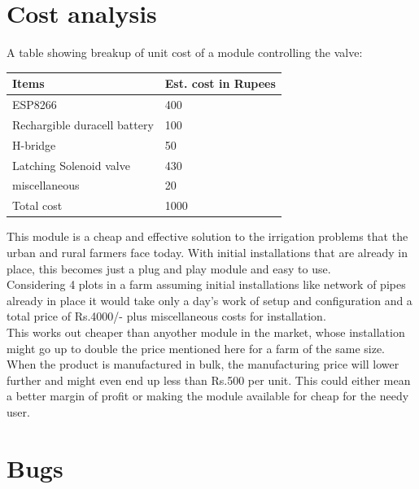 \documentclass[16pt]{article}
\begin{document}
\vspace{10cm}



\section{Cost analysis}

A table showing breakup of unit cost of a module controlling the valve: 

\vspace{0.5cm}
\begin{tabular}{|m{5cm}|m{3.5cm}|}
	\hline
	{\bf Items} & {\bf Est. cost in Rupees}\\ \hline
	ESP8266 & 400 \\ \hline
	Rechargible duracell battery & 100 \\ \hline
	H-bridge & 50 \\ \hline 
	Latching Solenoid valve & 430 \\ \hline
	miscellaneous & 20 \\ \hline
	Total cost & 1000 \\ \hline 
\end{tabular} 

\hfill 
\vspace{1cm}

This module is a cheap and effective solution to the irrigation problems that the urban and rural farmers face today.
With initial installations that are already in place, this becomes just a plug and play module and easy to use.\\

Considering 4 plots in a farm assuming initial installations like network of pipes already in place it would take only a day's work of setup and configuration 
and a total price of Rs.4000/- plus miscellaneous costs for installation.\\

This works out cheaper than anyother module in the market, whose installation might go up to double the price mentioned here for a farm of the same size.
When the product is manufactured in bulk, the manufacturing price will lower further and might even end up less than Rs.500 per unit. This could
either mean a better margin of profit or making the module available for cheap for the needy user.  


\vspace{15cm}
\section{Bugs}
\end{document}
